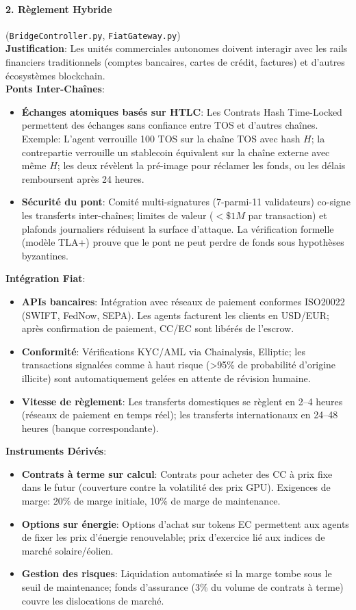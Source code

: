 \documentclass[11pt]{article}
\begin{document}
\paragraph{2. Règlement Hybride} (\texttt{BridgeController.py}, \texttt{FiatGateway.py})\\
\textbf{Justification}: Les unités commerciales autonomes doivent interagir avec les rails financiers traditionnels (comptes bancaires, cartes de crédit, factures) et d'autres écosystèmes blockchain.\\
\textbf{Ponts Inter-Chaînes}:
\begin{itemize}[noitemsep]
  \item \textbf{Échanges atomiques basés sur HTLC}: Les Contrats Hash Time-Locked permettent des échanges sans confiance entre TOS et d'autres chaînes. Exemple: L'agent verrouille 100 TOS sur la chaîne TOS avec hash $H$; la contrepartie verrouille un stablecoin équivalent sur la chaîne externe avec même $H$; les deux révèlent la pré-image pour réclamer les fonds, ou les délais remboursent après 24 heures.
  \item \textbf{Sécurité du pont}: Comité multi-signatures (7-parmi-11 validateurs) co-signe les transferts inter-chaînes; limites de valeur ($<\$1M$ par transaction) et plafonds journaliers réduisent la surface d'attaque. La vérification formelle (modèle TLA+) prouve que le pont ne peut perdre de fonds sous hypothèses byzantines.
\end{itemize}
\textbf{Intégration Fiat}:
\begin{itemize}[noitemsep]
  \item \textbf{APIs bancaires}: Intégration avec réseaux de paiement conformes ISO20022 (SWIFT, FedNow, SEPA). Les agents facturent les clients en USD/EUR; après confirmation de paiement, CC/EC sont libérés de l'escrow.
  \item \textbf{Conformité}: Vérifications KYC/AML via Chainalysis, Elliptic; les transactions signalées comme à haut risque (>95\% de probabilité d'origine illicite) sont automatiquement gelées en attente de révision humaine.
  \item \textbf{Vitesse de règlement}: Les transferts domestiques se règlent en 2--4 heures (réseaux de paiement en temps réel); les transferts internationaux en 24--48 heures (banque correspondante).
\end{itemize}
\textbf{Instruments Dérivés}:
\begin{itemize}[noitemsep]
  \item \textbf{Contrats à terme sur calcul}: Contrats pour acheter des CC à prix fixe dans le futur (couverture contre la volatilité des prix GPU). Exigences de marge: 20\% de marge initiale, 10\% de marge de maintenance.
  \item \textbf{Options sur énergie}: Options d'achat sur tokens EC permettent aux agents de fixer les prix d'énergie renouvelable; prix d'exercice lié aux indices de marché solaire/éolien.
  \item \textbf{Gestion des risques}: Liquidation automatisée si la marge tombe sous le seuil de maintenance; fonds d'assurance (3\% du volume de contrats à terme) couvre les dislocations de marché.
\end{itemize}
\end{document}
